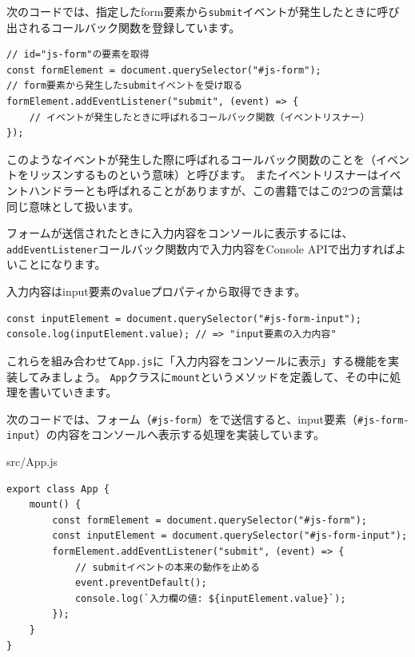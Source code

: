 次のコードでは、指定したform要素から\texttt{submit}イベントが発生したときに呼び出されるコールバック関数を登録しています。

\begin{lstlisting}
// id="js-form"の要素を取得
const formElement = document.querySelector("#js-form");
// form要素から発生したsubmitイベントを受け取る
formElement.addEventListener("submit", (event) => {
    // イベントが発生したときに呼ばれるコールバック関数（イベントリスナー）
});
\end{lstlisting}

このようなイベントが発生した際に呼ばれるコールバック関数のことを\textbf{}（イベントをリッスンするものという意味）と呼びます。
またイベントリスナーはイベントハンドラーとも呼ばれることがありますが、この書籍ではこの2つの言葉は同じ意味として扱います。

フォームが送信されたときに入力内容をコンソールに表示するには、
\texttt{addEventListener}コールバック関数内で入力内容をConsole
APIで出力すればよいことになります。

入力内容はinput要素の\texttt{value}プロパティから取得できます。

\begin{lstlisting}
const inputElement = document.querySelector("#js-form-input");
console.log(inputElement.value); // => "input要素の入力内容"
\end{lstlisting}

これらを組み合わせて\texttt{App.js}に「入力内容をコンソールに表示」する機能を実装してみましょう。
\texttt{App}クラスに\texttt{mount}というメソッドを定義して、その中に処理を書いていきます。

次のコードでは、フォーム（\texttt{\#js-form}）をで送信すると、input要素（\texttt{\#js-form-input}）の内容をコンソールへ表示する処理を実装しています。

\begin{listtitle}
src/App.js
\end{listtitle}
\begin{lstlisting}
export class App {
    mount() {
        const formElement = document.querySelector("#js-form");
        const inputElement = document.querySelector("#js-form-input");
        formElement.addEventListener("submit", (event) => {
            // submitイベントの本来の動作を止める
            event.preventDefault();
            console.log(`入力欄の値: ${inputElement.value}`);
        });
    }
}
\end{lstlisting}
\listend

